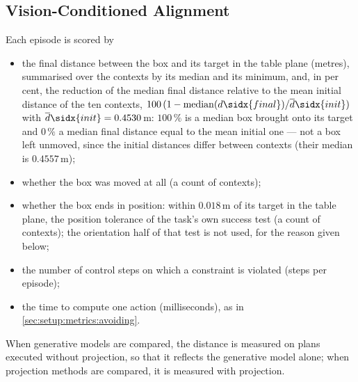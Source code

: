 
\subsection{Vision-Conditioned Alignment}\label{sec:setup:metrics:aligning}

Each episode is scored by
\begin{itemize}
  \item the final distance between the box and its target in the table plane (metres), summarised over the
    contexts by its median and its minimum, and, in per cent, the reduction of the median final distance
    relative to the mean initial distance of the ten contexts,
    $100\,(1-\operatorname{median}(d\sidx{final})/\overline{d}\sidx{init})$ with
    $\overline{d}\sidx{init}=0.4530$\,m: $100\,\%$ is a median box brought onto its target and $0\,\%$ a
    median final distance equal to the mean initial one --- not a box left unmoved, since the initial
    distances differ between contexts (their median is $0.4557$\,m);
  \item whether the box was moved at all (a count of contexts);
  \item whether the box ends in position: within $0.018$\,m of its target in the table plane, the position
    tolerance of the task's own success test (a count of contexts); the orientation half of that test is not
    used, for the reason given below;
  \item the number of control steps on which a constraint is violated (steps per episode);
  \item the time to compute one action (milliseconds), as in \autoref{sec:setup:metrics:avoiding}.
\end{itemize}
When generative models are compared, the distance is measured on plans executed without projection, so
that it reflects the generative model alone; when projection methods are compared, it is measured with
projection.

